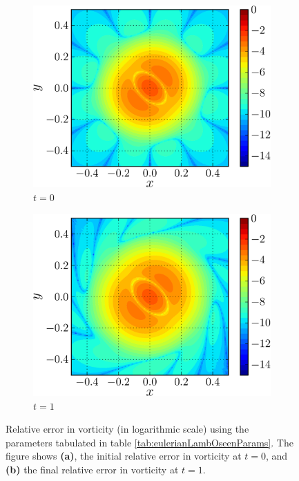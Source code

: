 	\begin{figure}[p]
     \centering
     \begin{subfigure}[b]{0.45\textwidth}
             \includegraphics[width=\textwidth]{figures/eulerian/lambOseen_wErrorInitial_compressed-crop.png}
             \caption{$t=0$}
             \label{fig:lambOseen_wErrorInitial_compressed-crop}
     \end{subfigure}%
     \qquad %
     \begin{subfigure}[b]{0.45\textwidth}
             \includegraphics[width=\textwidth]{figures/eulerian/lambOseen_wErrorFinal_compressed-crop.png}
             \caption{$t=1$}
             \label{fig:lambOseen_wErrorFinal_compressed-crop}
     \end{subfigure}
     
     \caption{Relative error in vorticity (in logarithmic scale) using the parameters tabulated in table \ref{tab:eulerianLambOseenParams}. The figure shows \textbf{(a)}, the initial relative error in vorticity at $t=0$, and \textbf{(b)} the final relative error in vorticity at $t=1$.}
     \label{fig:lambOseen_eulerian_wRelField_compressed}
	\end{figure}	
	
